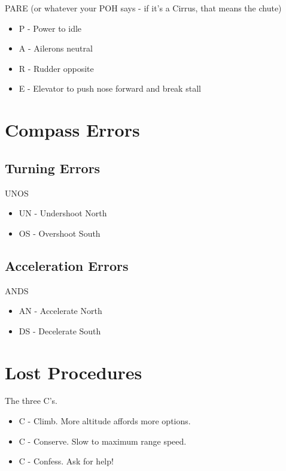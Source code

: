 PARE (or whatever your POH says - if it's a Cirrus, that means the chute)

\begin{itemize}
    \item P - Power to idle
    \item A - Ailerons neutral
    \item R - Rudder opposite
    \item E - Elevator to push nose forward and break stall
\end{itemize}

\section{Compass Errors}

\subsection{Turning Errors}

UNOS

\begin{itemize}
    \item UN - Undershoot North
    \item OS - Overshoot South
\end{itemize}

\subsection{Acceleration Errors}

ANDS

\begin{itemize}
    \item AN - Accelerate North
    \item DS - Decelerate South
\end{itemize}

\section{Lost Procedures}

The three C's.

\begin{itemize}
    \item C - Climb. More altitude affords more options.
    \item C - Conserve. Slow to maximum range speed.
    \item C - Confess. Ask for help!
\end{itemize}
